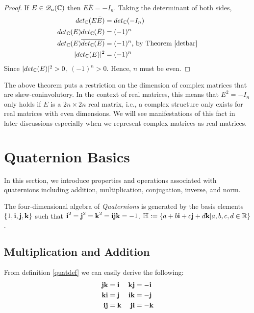 \begin{proof}
	If $E \in \mathscr{D}_{n}(\operatorname{\mathbb{C}})$ then $E\bar{E} = -I_n$. \newline Taking the determinant of both sides, 
	\begin{align*}
		det_{\operatorname{\mathbb{C}}}(E\bar{E}) &= det_{\operatorname{\mathbb{C}}}(-I_n) \\
		det_{\operatorname{\mathbb{C}}}(E)det_{\operatorname{\mathbb{C}}}(\bar{E}) &= (-1)^n \\
		det_{\operatorname{\mathbb{C}}}(E)\overline{det_{\operatorname{\mathbb{C}}}(E)} &= (-1)^n \text{, by Theorem \ref{detbar}} \\
		|det_{\operatorname{\mathbb{C}}}(E)|^2 &= (-1)^n
	\end{align*}
	Since $|det_{\operatorname{\mathbb{C}}}(E)|^2 > 0$, $(-1)^n > 0$. Hence, $n$ must be even.
\end{proof}

The above theorem puts a restriction on the dimension of complex matrices that are skew-coninvolutory. In the context of real matrices, this means that $E^2 = -I_n$ only holds if $E$ is a $2n\times 2n$ real matrix, i.e., a complex structure only exists for real matrices with even dimensions. We will see manifestations of this fact in later discussions especially when we represent complex matrices as real matrices.

\section{Quaternion Basics}

In this section, we introduce properties and operations associated with quaternions including addition, multiplication, conjugation, inverse, and norm.

\begin{definition}[Quaternion] \label{quatdef}
	The four-dimensional algebra of \emph{Quaternions} is generated by the basis elements $\{1,\textbf{i},\textbf{j},\textbf{k}\}$ such that $\textbf{i}^2 = \textbf{j}^2 = \textbf{k}^2 = \textbf{i} \textbf{j} \textbf{k} = -1$. $\operatorname{\mathbb{H}} := \{a + b\textbf{i} + c\textbf{j} + d\textbf{k} | a,b,c,d \in \operatorname{\mathbb{R}}\}$. \cite{stamaria}
\end{definition}

\subsection{Multiplication and Addition}

From definition \ref{quatdef} we can easily derive the following:
\begin{align*}
	\textbf{j}\textbf{k} &= \textbf{i} & \textbf{k}\textbf{j} &= -\textbf{i} \\
	\textbf{k}\textbf{i} &= \textbf{j} & \textbf{i}\textbf{k} &= -\textbf{j} \\
	\textbf{i}\textbf{j} &= \textbf{k} & \textbf{j}\textbf{i} &= -\textbf{k}
\end{align*}

